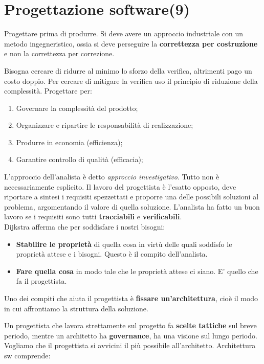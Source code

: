 



\section{Progettazione software(9)}

Progettare prima di produrre. Si deve avere un approccio industriale con un metodo ingegneristico, ossia si deve perseguire la \textbf{correttezza per costruzione} e non la correttezza per correzione.

Bisogna cercare di ridurre al minimo lo sforzo della verifica, altrimenti pago un costo doppio. Per cercare di mitigare la verifica uso il principio di riduzione della complessità. Progettare per:
\begin{enumerate}
	\item Governare la complessità del prodotto;
	\item Organizzare e ripartire le responsabilità di realizzazione;
	\item Produrre in economia (efficienza);
	\item Garantire controllo di qualità (efficacia);
\end{enumerate}

L'approccio dell'analista è detto \textit{approccio investigativo}. Tutto non è necessariamente esplicito. Il lavoro del progettista è l'esatto opposto, deve riportare a sintesi i requisiti spezzettati e proporre una delle possibili soluzioni al problema, argomentando il valore di quella soluzione. L'analista ha fatto un buon lavoro se i requisiti sono tutti \textbf{tracciabili} e \textbf{verificabili}.\\
Dijkstra afferma che per soddisfare i nostri bisogni:

\begin{itemize}

	\item \textbf{Stabilire le proprietà} di quella cosa in virtù delle quali soddisfo le proprietà attese e i bisogni. Questo è il compito dell'analista.
	\item \textbf{Fare quella cosa} in modo tale che le proprietà attese ci siano. E' quello che fa il progettista.

\end{itemize}

Uno dei compiti che aiuta il progettista è \textbf{fissare un'architettura}, cioè il modo in cui affrontiamo la struttura della soluzione.

Un progettista che lavora strettamente sul progetto fa \textbf{scelte tattiche} sul breve periodo, mentre un architetto ha \textbf{governance}, ha una visione sul lungo periodo. Vogliamo che il progettista si avvicini il più possibile all'architetto. Architettura sw comprende:

